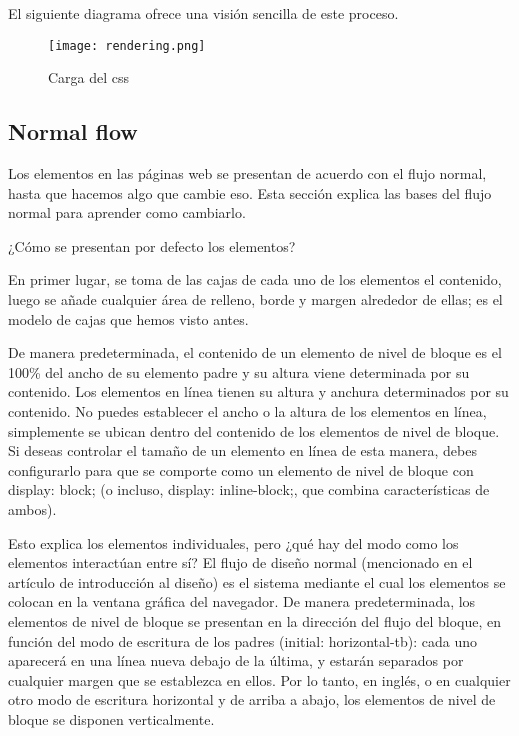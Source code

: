 \begin{enumerate}
\begin{itemize}
	
\end{itemize}
El siguiente diagrama ofrece una visión sencilla de este proceso.

\begin{figure}[H]
	\center
	\texttt{[image: rendering.png]}
	\caption{Carga del css}
	\label{fig:super}
\end{figure}


\subsection{Normal flow}

Los elementos en las páginas web se presentan de acuerdo con el flujo normal, hasta que hacemos algo que cambie eso. Esta sección explica las bases del flujo normal para aprender como cambiarlo.

¿Cómo se presentan por defecto los elementos?

En primer lugar, se toma de las cajas de cada uno de los elementos el contenido, luego se añade cualquier área de relleno, borde y margen alrededor de ellas; es el modelo de cajas que hemos visto antes.

De manera predeterminada, el contenido de un elemento de nivel de bloque es el 100\% del ancho de su elemento padre y su altura viene determinada por su contenido. Los elementos en línea tienen su altura y anchura determinados por su contenido. No puedes establecer el ancho o la altura de los elementos en línea, simplemente se ubican dentro del contenido de los elementos de nivel de bloque. Si deseas controlar el tamaño de un elemento en línea de esta manera, debes configurarlo para que se comporte como un elemento de nivel de bloque con display: block; (o incluso, display: inline-block;, que combina características de ambos).

Esto explica los elementos individuales, pero ¿qué hay del modo como los elementos interactúan entre sí? El flujo de diseño normal (mencionado en el artículo de introducción al diseño) es el sistema mediante el cual los elementos se colocan en la ventana gráfica del navegador. De manera predeterminada, los elementos de nivel de bloque se presentan en la dirección del flujo del bloque, en función del modo de escritura de los padres (initial: horizontal-tb): cada uno aparecerá en una línea nueva debajo de la última, y estarán separados por cualquier margen que se establezca en ellos. Por lo tanto, en inglés, o en cualquier otro modo de escritura horizontal y de arriba a abajo, los elementos de nivel de bloque se disponen verticalmente.


\end{enumerate}
